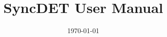\documentclass{article}
\begin{document}
\title{SyncDET User Manual}
\date{\today}

\maketitle
\tableofcontents






\end{document}

